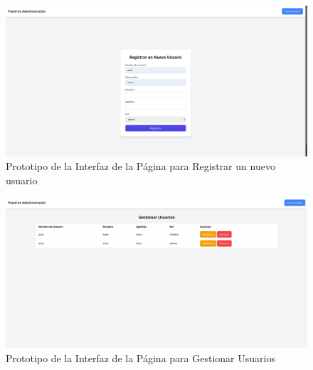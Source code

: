 \documentclass{article}
\begin{document}
\begin{figure}[H]
    \centering
    \includegraphics[width=1\textwidth]{img/registrar.png}
    \caption{Prototipo de la Interfaz de la Página para Registrar un nuevo usuario}
    \label{fig:prototipo_interfaz_registrar}
\end{figure}

\begin{figure}[H]
    \centering
    \includegraphics[width=1\textwidth]{img/usuarios.png}
    \caption{Prototipo de la Interfaz de la Página para Gestionar Usuarios}
    \label{fig:prototipo_interfaz_usuarios}
\end{figure}
\end{document}
